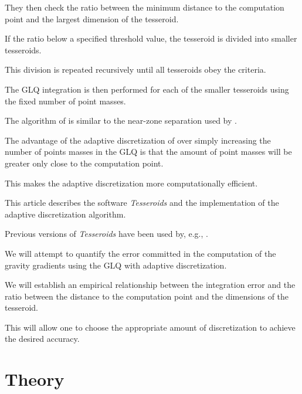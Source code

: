 \documentclass[paper,twocolumn]{geophysics}
\begin{document}
They then check the ratio between the minimum distance to the computation point
and the largest dimension of the tesseroid.

If the ratio below a specified threshold value, the tesseroid is divided into
smaller tesseroids.

This division is repeated recursively until all tesseroids obey the criteria.

The GLQ integration is then performed for each of the smaller tesseroids
using the fixed number of point masses.

The algorithm of \citet{Li2011} is similar to the near-zone separation used by
\citet{Grombein2013}.

The advantage of the adaptive discretization of \citet{Li2011} over simply
increasing the number of points masses in the GLQ is that the
amount of point masses will be greater only close to the computation point.

This makes the adaptive discretization more computationally efficient.



This article describes the software \textit{Tesseroids} and the implementation
of the adaptive discretization algorithm.

Previous versions of \textit{Tesseroids} have been used by, e.g.,
\citet{Alvarez2012, Bouman2013, Bouman2013a, Mariani2013, Braitenberg2014,
Braitenberg2011, Fullea2014}.

We will attempt to quantify the error committed in the computation of the
gravity gradients using the GLQ with adaptive discretization.

We will establish an empirical relationship between the integration error and
the ratio between the distance to the computation point and the dimensions of
the tesseroid.

This will allow one to choose the appropriate amount of discretization to
achieve the desired accuracy.


\section{Theory}
\end{document}
